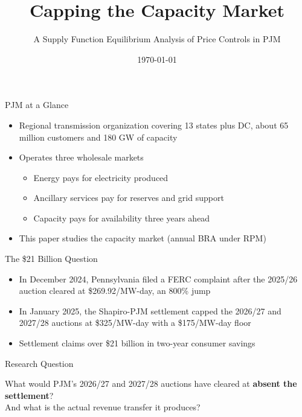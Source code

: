 \documentclass[aspectratio=169,14pt]{beamer}
\title{Capping the Capacity Market}
\subtitle{A Supply Function Equilibrium Analysis of Price Controls in PJM}
\author{}
\institute{}
\date{\today}
\begin{document}

\maketitle

\begin{frame}{PJM at a Glance}
  \begin{itemize}
    \item Regional transmission organization covering 13 states plus DC,
          about 65 million customers and 180 GW of capacity
    \item Operates three wholesale markets
      \begin{itemize}
        \item Energy pays for electricity produced
        \item Ancillary services pay for reserves and grid support
        \item Capacity pays for availability three years ahead
      \end{itemize}
    \item This paper studies the capacity market (annual BRA under RPM)
  \end{itemize}
\end{frame}

\begin{frame}{The \$21 Billion Question}
  \begin{itemize}
    \item In December 2024, Pennsylvania filed a FERC complaint after the
          2025/26 auction cleared at \$269.92/MW-day, an 800\% jump
    \item In January 2025, the Shapiro-PJM settlement capped the 2026/27
          and 2027/28 auctions at \$325/MW-day with a \$175/MW-day floor
    \item Settlement claims over \$21 billion in two-year
          consumer savings
  \end{itemize}
\end{frame}

\begin{frame}{Research Question}
  \vfill
  \begin{center}
    \Large
    What would PJM's 2026/27 and 2027/28 auctions have cleared at
    \textbf{absent the settlement}? \\[1em]
    And what is the actual revenue transfer it produces?
  \end{center}
  \vfill
\end{frame}
\end{document}
